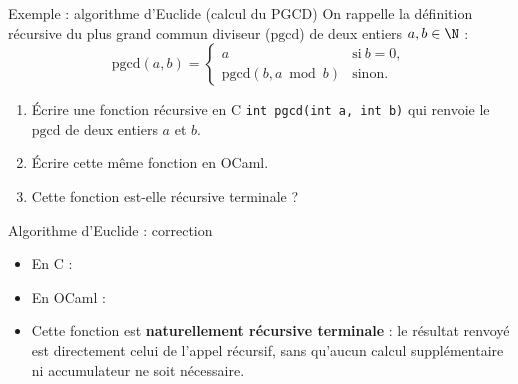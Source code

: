 \documentclass[10pt]{beamer}
\begin{document}
\begin{frame}[fragile]{\Ctitle}{\stitle}
	\begin{exampleblock}{Exemple : algorithme d'Euclide (calcul du PGCD)}
		On rappelle la définition récursive du plus grand commun diviseur ($\mathrm{pgcd}$) de deux entiers $a, b \in \N$ :
		$$\mathrm{pgcd}(a, b) = \left\{ \begin{array}{ll} a & \mathrm{si\ } b = 0, \\ \mathrm{pgcd}(b, a \bmod b) & \mathrm{sinon.} \end{array} \right.$$
		\begin{enumerate}
			\item<2-> Écrire une fonction récursive en C {\tt int pgcd(int a, int b)} qui renvoie le $\mathrm{pgcd}$ de deux entiers $a$ et $b$.
			\item<3-> Écrire cette même fonction en OCaml.
			\item<4-> Cette fonction est-elle récursive terminale ?
		\end{enumerate}
	\end{exampleblock}
\end{frame}

\begin{frame}[fragile]{\Ctitle}{\stitle}
	\begin{exampleblock}{Algorithme d'Euclide : correction}
		\begin{itemize}
			\item<1-> En C :
			\item<2-> En OCaml :
			\item<3-> \textcolor{OliveGreen}{Cette fonction est \textbf{naturellement récursive terminale} : le résultat renvoyé est directement celui de l'appel récursif, sans qu'aucun calcul supplémentaire ni accumulateur ne soit nécessaire.}
		\end{itemize}
	\end{exampleblock}
\end{frame}
\end{document}
